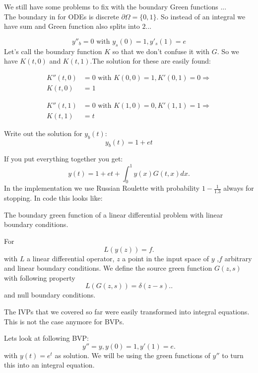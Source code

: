 \documentclass[a4paper,12pt]{article}
\begin{document}
We still have some problems to fix with the boundary Green functions ... \\
The boundary in for ODEs is discrete $\partial \Omega = \{0,1\}$.
So instead of an integral we have sum and Green function also splits into $2$...

$$
    y''_{b} = 0 \text{ with } y_{s}(0)=1, y'_{s}(1)= e
$$
Let's call the boundary function $K$ so that we don't confuse it with $G$.
So we have $K(t,0)$ and $K(t,1)$.The solution for these are easily found:

\begin{align*}
    K''(t,0) & = 0 \text{ with } K(0,0)=1, K'(0,1)=0 \Rightarrow \\
    K(t,0)   & =1
\end{align*}

\begin{align*}
    K''(t,1) & =0 \text{ with } K(1,0)=0, K'(1,1)=1 \Rightarrow \\
    K(t,1)   & =t
\end{align*}

Write out the solution for $y_{b}(t)$:
$$
    y_{b}(t) = 1 + e t
$$

If you put everything together you get:
$$
    y(t) = 1+et +\int_{0}^{1} y(x) G(t,x)dx.
$$
In the implementation we use Russian Roulette  with probability $1-\frac{1}{1.3}$ always for stopping.
In code this looks like:



\begin{definition}
    The boundary green function of a linear differential problem with linear boundary
    conditions.
\end{definition}

\begin{definition}
    For
    \[
        L(y(z)) = f
        .\]
    with $L$ a linear differential operator, $z$ a point in the input space of $y$
    ,$f$ arbitrary and linear boundary conditions.
    We define the source green function $G(z,s)$ with following property
    \[
        L(G(z,s))=\delta(z-s).
        .\]
    and null boundary conditions.
\end{definition}


The IVPs that we covered so far were easily transformed into integral equations.
This is not the case anymore for BVPs.
\begin{example}[$y''=y$]
    Lets look at following BVP:
    \begin{equation}
        y''=y, y(0)=1, y'(1)=e.
    \end{equation}
    with $y(t)= e^{t}$ as solution. We will be using
    the green functions of $y''$ to turn this into an integral equation.
\end{example}
\end{document}
